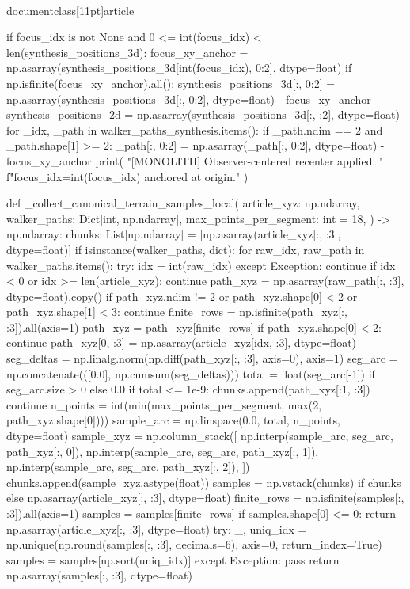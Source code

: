\\documentclass[11pt]{article}
\begin{document}
\begin{CodeBlock}
{{{{{    if focus_idx is not None and 0 <= int(focus_idx) < len(synthesis_positions_3d):
        focus_xy_anchor = np.asarray(synthesis_positions_3d[int(focus_idx), 0:2], dtype=float)
        if np.isfinite(focus_xy_anchor).all():
            synthesis_positions_3d[:, 0:2] = np.asarray(synthesis_positions_3d[:, 0:2], dtype=float) - focus_xy_anchor
            synthesis_positions_2d = np.asarray(synthesis_positions_3d[:, :2], dtype=float)
            for _idx, _path in walker_paths_synthesis.items():
                if _path.ndim == 2 and _path.shape[1] >= 2:
                    _path[:, 0:2] = np.asarray(_path[:, 0:2], dtype=float) - focus_xy_anchor
            print(
                "[MONOLITH] Observer-centered recenter applied: "
                f"focus_idx={int(focus_idx)} anchored at origin."
            )

    def _collect_canonical_terrain_samples_local(
        article_xyz: np.ndarray,
        walker_paths: Dict[int, np.ndarray],
        max_points_per_segment: int = 18,
    ) -> np.ndarray:
        chunks: List[np.ndarray] = [np.asarray(article_xyz[:, :3], dtype=float)]
        if isinstance(walker_paths, dict):
            for raw_idx, raw_path in walker_paths.items():
                try:
                    idx = int(raw_idx)
                except Exception:
                    continue
                if idx < 0 or idx >= len(article_xyz):
                    continue
                path_xyz = np.asarray(raw_path[:, :3], dtype=float).copy()
                if path_xyz.ndim != 2 or path_xyz.shape[0] < 2 or path_xyz.shape[1] < 3:
                    continue
                finite_rows = np.isfinite(path_xyz[:, :3]).all(axis=1)
                path_xyz = path_xyz[finite_rows]
                if path_xyz.shape[0] < 2:
                    continue
                path_xyz[0, :3] = np.asarray(article_xyz[idx, :3], dtype=float)
                seg_deltas = np.linalg.norm(np.diff(path_xyz[:, :3], axis=0), axis=1)
                seg_arc = np.concatenate(([0.0], np.cumsum(seg_deltas)))
                total = float(seg_arc[-1]) if seg_arc.size > 0 else 0.0
                if total <= 1e-9:
                    chunks.append(path_xyz[:1, :3])
                    continue
                n_points = int(min(max_points_per_segment, max(2, path_xyz.shape[0])))
                sample_arc = np.linspace(0.0, total, n_points, dtype=float)
                sample_xyz = np.column_stack([
                    np.interp(sample_arc, seg_arc, path_xyz[:, 0]),
                    np.interp(sample_arc, seg_arc, path_xyz[:, 1]),
                    np.interp(sample_arc, seg_arc, path_xyz[:, 2]),
                ])
                chunks.append(sample_xyz.astype(float))
        samples = np.vstack(chunks) if chunks else np.asarray(article_xyz[:, :3], dtype=float)
        finite_rows = np.isfinite(samples[:, :3]).all(axis=1)
        samples = samples[finite_rows]
        if samples.shape[0] <= 0:
            return np.asarray(article_xyz[:, :3], dtype=float)
        try:
            _, uniq_idx = np.unique(np.round(samples[:, :3], decimals=6), axis=0, return_index=True)
            samples = samples[np.sort(uniq_idx)]
        except Exception:
            pass
        return np.asarray(samples[:, :3], dtype=float)

}}}}}
\end{CodeBlock}
\end{document}
